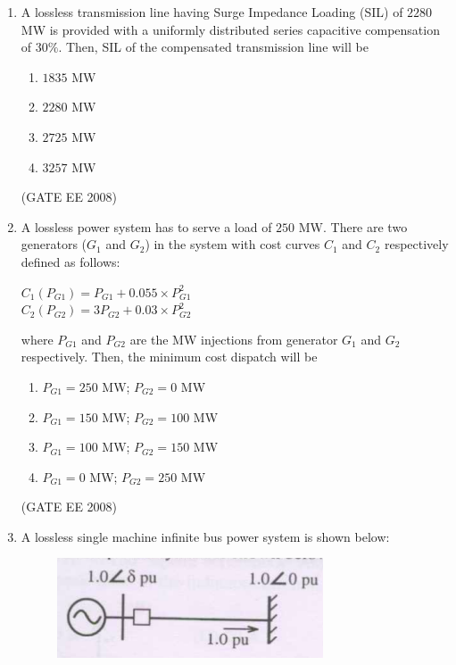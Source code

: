 \documentclass[journal,12pt,onecolumn]{IEEEtran}
\theoremstyle{remark}
\begin{document}
\begin{enumerate}[start=1, label=Q.\arabic*]
\item A lossless transmission line having Surge Impedance Loading (SIL) of $2280$ MW is provided with a uniformly distributed series capacitive compensation of $30 \%$. Then, SIL of the compensated transmission line will be

\begin{enumerate}[label=(\Alph*)]
    \item $1835$ MW
    \item $2280$ MW
    \item $2725$ MW
    \item $3257$ MW
\end{enumerate}
\hfill (GATE EE 2008)


\item A lossless power system has to serve a load of $250$ MW. There are two generators ($G_1$ and $G_2$) in the system with cost curves $C_1$ and $C_2$ respectively defined as follows:
\begin{center}
$
C_1(P_{G1}) = P_{G1}+0.055 \times P_{G1}^2
$\\
$
C_2(P_{G2}) = 3P_{G2}+0.03 \times P_{G2}^2
$\\
\end{center}
where $P_{G1}$ and $P_{G2}$ are the MW injections from generator $G_1$ and $G_2$ respectively. Then, the minimum cost dispatch will be

\begin{multicols}{2}
\begin{enumerate}[label=(\Alph*)]
    \item $P_{G1} = 250$ MW; $P_{G2} = 0$ MW
    \item $P_{G1} = 150$ MW; $P_{G2} = 100$ MW
    \item $P_{G1} = 100$ MW; $P_{G2} = 150$ MW
    \item $P_{G1} = 0$ MW; $P_{G2} = 250$ MW
\end{enumerate}
\end{multicols}
\hfill (GATE EE 2008)


\item A lossless single machine infinite bus power system is shown below:

\begin{figure}[H]
    \centering
    \includegraphics[width=\columnwidth]{Fig/q53.png}
\end{figure}


\end{enumerate}
\end{document}
